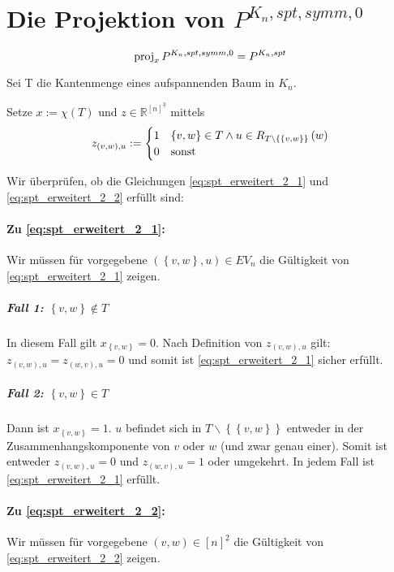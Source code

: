 \documentclass[10p,a4paper,BCOR = 12mm, DIV=15]{scrbook}
\begin{document}
{\section{Die Projektion von $P^{K_n, spt, symm, 0}$}

\begin{Sa}\label{sa:proj_spt_erw}
\begin{displaymath}
\operatorname{proj}_x P^{K_n, spt, symm, 0} = P^{K_n, spt}
\end{displaymath}
\end{Sa}
\begin{bew}

Sei T die Kantenmenge eines aufspannenden Baum in $K_n$.

Setze $x:=\chi\left(T\right)$ und $z\in \mathbb{R}^{[n]^{\underline{3}}}$ mittels
\begin{displaymath}
z_{\left(v, w\right), u} := \begin{cases}
1 & \left\{v, w\right\}\in T\wedge u\in R_{T\backslash \left\{\left\{v, w\right\}\right\}}\left(w\right) \\
0 & \textnormal{sonst}
\end{cases}
\end{displaymath}

Wir überprüfen, ob die Gleichungen \eqref{eq:spt_erweitert_2_1} und \eqref{eq:spt_erweitert_2_2} erfüllt sind:

\paragraph{Zu \eqref{eq:spt_erweitert_2_1}:} Wir müssen für vorgegebene $\left(\left\{v, w\right\}, u\right) \in EV_n$ die Gültigkeit von \eqref{eq:spt_erweitert_2_1} zeigen.

\subparagraph{Fall 1: $\left\{v, w\right\}\notin T$} In diesem Fall gilt $x_{\left\{v, w\right\}}=0$. Nach Definition von $z_{(v, w), u}$ gilt: $z_{(v, w), u}=z_{(w, v), u}=0$ und somit ist \eqref{eq:spt_erweitert_2_1} sicher erfüllt.

\subparagraph{Fall 2: $\left\{v, w\right\}\in T$} Dann ist $x_{\left\{v, w\right\}} = 1$. $u$ befindet sich in $T\backslash \left\{\left\{v, w\right\}\right\}$ entweder in der Zusammenhangskomponente von $v$ oder $w$ (und zwar genau einer). Somit ist entweder $z_{(v, w), u}=0$ und $z_{(w, v), u}=1$ oder umgekehrt. In jedem Fall ist \eqref{eq:spt_erweitert_2_1} erfüllt.

\paragraph{Zu \eqref{eq:spt_erweitert_2_2}:} Wir müssen für vorgegebene $\left(v, w\right) \in \left[n\right]^{\underline{2}}$ die Gültigkeit von \eqref{eq:spt_erweitert_2_2} zeigen.


\end{bew}}
\end{document}
